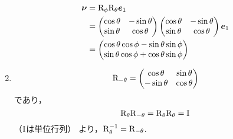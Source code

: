 \begin{enumerate}[label=(\roman*)]
      \begin{align}
        \boldsymbol{\nu} &= \mathrm{R}_\phi \mathrm{R}_\theta \boldsymbol{e}_1 \\
          &=
          \begin{pmatrix}
            \cos\theta & -\sin\theta \\
            \sin\theta & \cos\theta
          \end{pmatrix}
          \begin{pmatrix}
            \cos\theta & -\sin\theta \\
            \sin\theta & \cos\theta
          \end{pmatrix}
          \boldsymbol{e}_1\\
          &=
          \begin{pmatrix}
            \cos\theta \cos\phi - \sin\theta \sin\phi \\
            \sin\theta \cos\phi + \cos\theta \sin\phi
          \end{pmatrix}
      \end{align}
    \item
      \begin{equation}
        \mathrm{R}_{-\theta} 
          =
          \begin{pmatrix}
            \cos\theta  & \sin\theta \\
            -\sin\theta & \cos\theta
          \end{pmatrix}
      \end{equation}
      であり，
      \begin{equation}
        \mathrm{R}_\theta \mathrm{R}_{-\theta} = \mathrm{R}_{\theta} \mathrm{R}_\theta = \mathrm{I}
      \end{equation}
      （$\mathrm{I}$は単位行列）
      より，$\mathrm{R}_\theta^{-1} = \mathrm{R}_{-\theta}$.
  \end{enumerate}